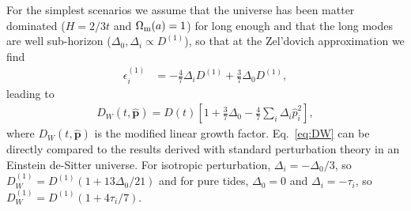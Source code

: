 \documentclass[a4paper,11pt]{article}
\newcommand{\vp}{{\bm p}}
\begin{document}
For the simplest scenarios we assume that the universe has been matter
dominated ($H = 2/3t$ and $\Omega_{\rm m}(a) = 1$) for long enough and
that the long modes are well sub-horizon ($\Delta_0, \Delta_i \propto D^{(1)}$), so
that at the Zel'dovich approximation we find
\begin{align}
    \epsilon^{(1)}_i &=
    -\frac47 \Delta_i D^{(1)} + \frac37 \Delta_0 D^{(1)}, 
\end{align}
leading to 
\begin{align}
D_W(t, \hat\vp) = D(t)\left[1 + \frac{3}{7}\Delta_0 - \frac{4}{7}\sum_i \Delta_i\hat{p}_i^2 \right],
\label{eq:DW}
\end{align}
where $D_W(t,\hat\vp)$ is the modified linear growth factor.
Eq.~\eqref{eq:DW} can be directly compared to the results derived with standard
perturbation theory in an Einstein de-Sitter universe.
For isotropic perturbation, $\Delta_i = - \Delta_0 / 3$, so $D^{(1)}_W = D^{(1)} (1 + 13
\Delta_0 / 21)$ and for pure tides, $\Delta_0=0$ and $\Delta_i = -\tau_i$, so $D^{(1)}_W = D^{(1)} (1 + 4 \tau_i / 7)$.
\end{document}
